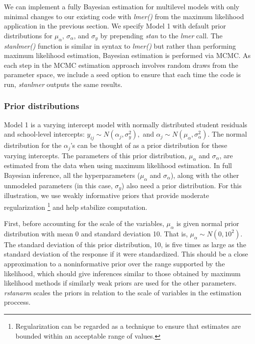 We can implement a fully Bayesian estimation for multilevel models with only minimal changes to our existing code with \textit{lmer()} from the maximum likelihood application in the previous section. We specify Model 1 with default prior distributions for $\mu_{\alpha}$, $\sigma_{\alpha}$, and $\sigma_{y}$ by prepending \textit{stan\textunderscore} to the \textit{lmer} call. The \textit{stan\textunderscore lmer()} function is similar in syntax to \textit{lmer()} but rather than performing maximum likelihood estimation, Bayesian estimation is performed via MCMC.  As each step in the MCMC estimation approach involves random draws from the parameter space, we include a seed option to ensure that each time the code is run, \textit{stan\textunderscore lmer} outputs the same results.

\subsubsection*{Prior distributions}
Model 1 is a varying intercept model with normally distributed student residuals and school-level intercepts: $y_{ij} \sim N(\alpha_{j}, \sigma_{y}^{2}),$ and $\alpha_{j}\sim N(\mu_{\alpha}, \sigma_{\alpha}^{2})$. The normal distribution for the $\alpha_{j}$'s can be thought of as a prior distribution for these varying intercepts. The parameters of this prior distribution, $\mu_{\alpha}$ and $\sigma_{\alpha}$, are estimated from the data when using maximum likelihood estimation. In full Bayesian inference, all the hyperparameters ($\mu_{\alpha}$ and $\sigma_{\alpha}$), along with the other unmodeled parameters (in this case, $\sigma_{y}$) also need a prior distribution. For this illustration, we use weakly informative priors that provide moderate regularization \footnote{Regularization can be regarded as a technique to ensure that estimates are bounded within an acceptable range of values.} and help stabilize computation.

First, before accounting for the scale of the variables, $\mu_{\alpha}$ is given normal prior distribution with mean 0 and standard deviation 10.  That is, $\mu_{\alpha} \sim N(0, 10^2)$. The standard deviation of this prior distribution, 10, is five times as large as the standard deviation of the response if it were standardized. This should be a close approximation to a noninformative prior over the range supported by the likelihood, which should give inferences similar to those obtained by maximum likelihood methods if similarly weak priors are used for the other parameters. \textit{rstanarm} scales the priors in relation to the scale of variables in the estimation proccess.

